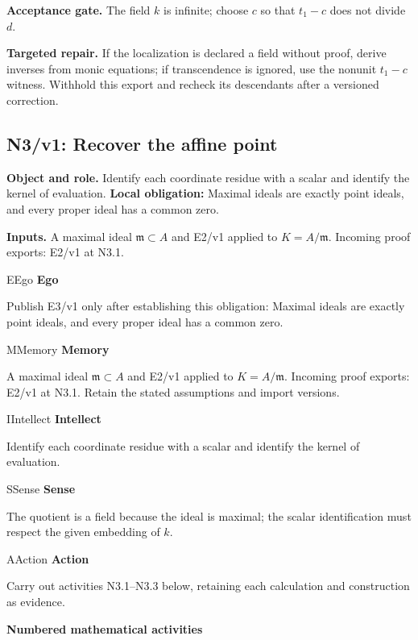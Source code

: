 \documentclass[preprint,12pt,aps,pra,showkeys,amsmath,amssymb,superscriptaddress,floatfix]{revtex4-2}
\theoremstyle{definition}
\theoremstyle{remark}
\newcommand{\mmfaculty}[3]{%
 \begin{mmfacultybox}{#1}{#2}
 {\sffamily\bfseries\color{MMBlue}#2}\par\smallskip #3
 \end{mmfacultybox}}
\newcommand{\field}[2]{\par\smallskip\noindent\textbf{#1.} #2\par}
\begin{document}
\field{Acceptance gate}{The field \(k\) is infinite; choose \(c\) so that \(t_1-c\) does not
divide \(d\).}

\field{Targeted repair}{If the localization is declared a field without proof, derive inverses
from monic equations; if transcendence is ignored, use the nonunit
\(t_1-c\) witness. Withhold this export and recheck its descendants
after a versioned correction.}

\clearpage

\subsection{N3/v1: Recover the affine point}

\field{Object and role}{Identify each coordinate residue with a scalar and identify the kernel
of evaluation. \textbf{Local obligation:} Maximal ideals are exactly
point ideals, and every proper ideal has a common zero.}

\field{Inputs}{A maximal ideal \(\mathfrak m\subset A\) and E2/v1 applied to
\(K=A/\mathfrak m\). Incoming proof exports: E2/v1 at N3.1.}

\mmfaculty{E}{Ego}{Publish E3/v1 only after establishing this obligation: Maximal ideals
are exactly point ideals, and every proper ideal has a common zero.}

\mmfaculty{M}{Memory}{A maximal ideal \(\mathfrak m\subset A\) and E2/v1 applied to
\(K=A/\mathfrak m\). Incoming proof exports: E2/v1 at N3.1. Retain the
stated assumptions and import versions.}

\mmfaculty{I}{Intellect}{Identify each coordinate residue with a scalar and identify the kernel
of evaluation.}

\mmfaculty{S}{Sense}{The quotient is a field because the ideal is maximal; the scalar
identification must respect the given embedding of \(k\).}

\mmfaculty{A}{Action}{Carry out activities N3.1--N3.3 below, retaining each calculation and
construction as evidence.}

\smallskip\noindent\textbf{Numbered mathematical activities}
\end{document}
